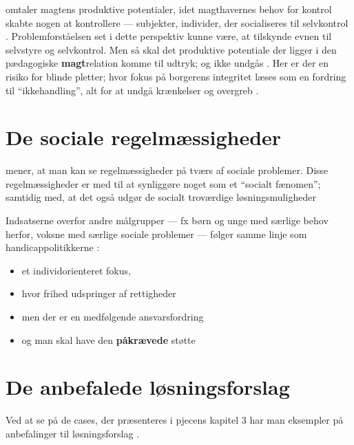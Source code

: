 \citeauthor{foucaultOvervagningOgStraf2005} omtaler magtens produktive potentialer, idet magthavernes behov for kontrol skabte nogen at kontrollere --- subjekter, individer, der socialiseres til selvkontrol \autocite{foucaultOvervagningOgStraf2005}.
Problemforståelsen set i dette perspektiv kunne være, at tilskynde evnen til selvstyre og selvkontrol.
Men så skal det produktive potentiale der ligger i den pædagogiske \textbf{magt}relation komme til udtryk; og ikke undgås \autocite{hurFrigorelsensMagt2015}.
Her er der en risiko for blinde pletter; hvor fokus på borgerens integritet læses som en fordring til “ikkehandling”, alt for at undgå krænkelser og overgreb \autocite{langagerDetAfmalteLiv2013}.

\section{De sociale regelmæssigheder}

\citeauthor{scheurichPolicyArchaeologyNew1994} mener, at man kan se regelmæssigheder på tværs af sociale problemer.
Disse regelmæssigheder er med til at synliggøre noget som et “socialt fænomen”; samtidig med, at det også udgør de socialt troværdige løsningsmuligheder \autocite[s. 301]{scheurichPolicyArchaeologyNew1994}

Indsatserne overfor andre målgrupper — fx børn og unge med særlige behov herfor, voksne med særlige sociale problemer — følger samme linje som handicappolitikkerne \autocite[Kap. 6, 15]{social-ogindenrigsministerietBekendtgorelseAfLov2019}:
\begin{itemize}
  \item
    et individorienteret fokus, 
  \item
    hvor frihed udspringer af rettigheder
  \item
    men der er en medfølgende ansvarsfordring
  \item
    og man skal have den \textbf{påkrævede} støtte
\end{itemize}

\section{De anbefalede løsningsforslag}
Ved at se på de cases, der præsenteres i pjecens kapitel 3 har man eksempler på anbefalinger til løsningsforslag \autocite[ss. 18-40]{klStyringAfDet2017}.

